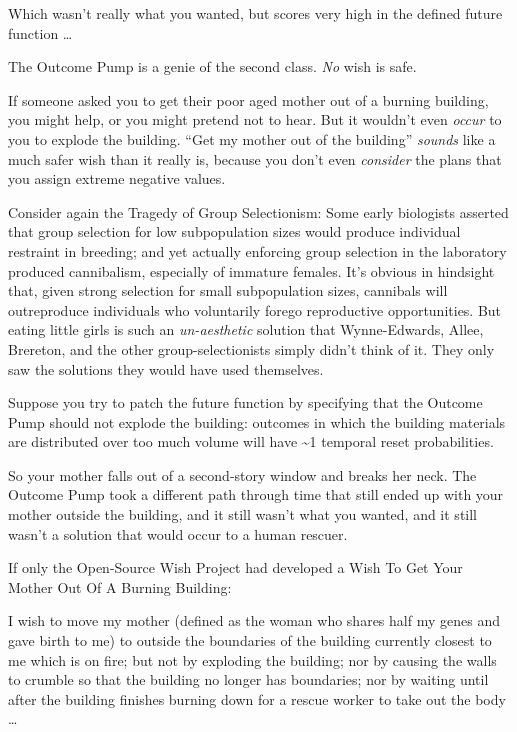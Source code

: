 {
 Which wasn't really what you wanted, but scores
very high in the defined future function \ldots}

{
 The Outcome Pump is a genie of the second class. \textit{No} wish
is safe.}

{
 If someone asked you to get their poor aged mother out of a
burning building, you might help, or you might pretend not to hear. But
it wouldn't even \textit{occur} to you to explode the
building. ``Get my mother out of the
building'' \textit{sounds} like a much safer wish
than it really is, because you don't even
\textit{consider} the plans that you assign extreme negative values.}

{
 Consider again the Tragedy of Group Selectionism: Some early
biologists asserted that group selection for low subpopulation sizes
would produce individual restraint in breeding; and yet actually
enforcing group selection in the laboratory produced cannibalism,
especially of immature females. It's obvious in
hindsight that, given strong selection for small subpopulation sizes,
cannibals will outreproduce individuals who voluntarily forego
reproductive opportunities. But eating little girls is such an
\textit{un-aesthetic} solution that Wynne-Edwards, Allee, Brereton, and
the other group-selectionists simply didn't think of
it. They only saw the solutions they would have used themselves.}

{
 Suppose you try to patch the future function by specifying that
the Outcome Pump should not explode the building: outcomes in which the
building materials are distributed over too much volume will have \~{}1
temporal reset probabilities.}

{
 So your mother falls out of a second-story window and breaks her
neck. The Outcome Pump took a different path through time that still
ended up with your mother outside the building, and it still
wasn't what you wanted, and it still
wasn't a solution that would occur to a human rescuer.}

{
 If only the Open-Source Wish Project had developed a Wish To Get
Your Mother Out Of A Burning Building:}

{
 I wish to move my mother (defined as the woman who shares half my
genes and gave birth to me) to outside the boundaries of the building
currently closest to me which is on fire; but not by exploding the
building; nor by causing the walls to crumble so that the building no
longer has boundaries; nor by waiting until after the building finishes
burning down for a rescue worker to take out the body \ldots}

